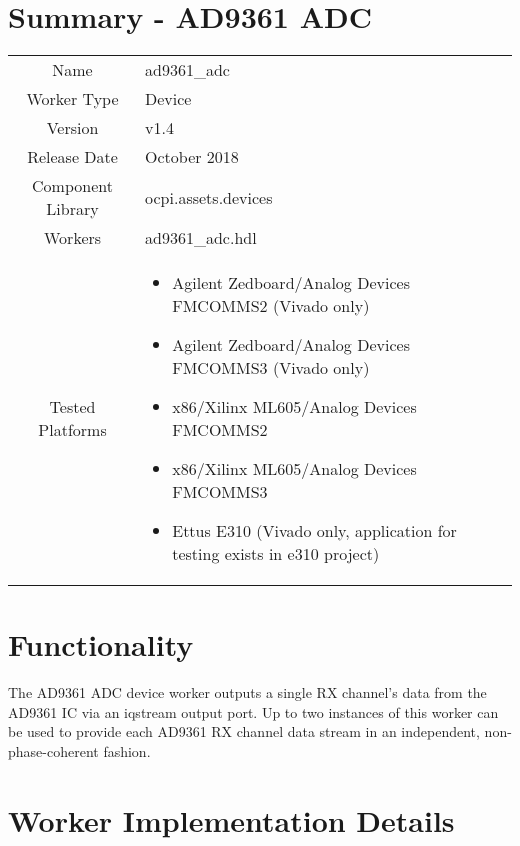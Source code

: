 \documentclass{article}
\author{} %
\date{Version \docVersion} %
\title{\docTitle}
\def\docVersion{1.4}
\def\comp{ad9361\_adc}
\def\Comp{AD9361 ADC}
\begin{document}
\section*{Summary - \Comp}
\begin{tabular}{|c|M{13.5cm}|}
	\hline
	                  &                  \\
	\hline
	Name              & \comp            \\
	\hline
	Worker Type       & Device           \\
	\hline
	Version           & v\docVersion{}   \\
	\hline
	Release Date      & October 2018           \\
	\hline
	Component Library & ocpi.assets.devices     \\
	\hline
	Workers           & \comp.hdl        \\
	\hline
	Tested Platforms  &
\begin{itemize}
  \item Agilent Zedboard/Analog Devices FMCOMMS2 (Vivado only)
  \item Agilent Zedboard/Analog Devices FMCOMMS3 (Vivado only)
  \item x86/Xilinx ML605/Analog Devices FMCOMMS2
  \item x86/Xilinx ML605/Analog Devices FMCOMMS3
  \item Ettus E310 (Vivado only, application for testing exists in e310 project)
\end{itemize} \\
	\hline
\end{tabular}
\section*{Functionality}
	The \Comp{} device worker outputs a single RX channel's data from the AD9361 IC\cite{ad9361} via an iqstream output port. Up to two instances of this worker can be used to provide each AD9361 RX channel data stream in an independent, non-phase-coherent fashion.

\section*{Worker Implementation Details}
\end{document}
